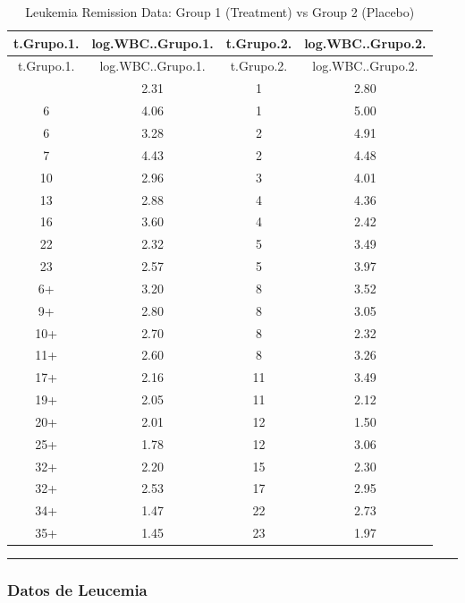 \documentclass[
]{article}
\begin{document}
\begin{tcolorbox}[enhanced jigsaw, opacityback=0, bottomrule=.15mm, leftrule=.75mm, rightrule=.15mm, arc=.35mm, toprule=.15mm, left=2mm, colframe=quarto-callout-note-color-frame, breakable, colback=white]
\begin{longtable}[]{@{}cccc@{}}
\caption{Leukemia Remission Data: Group 1 (Treatment) vs Group 2
(Placebo)}\tabularnewline
\toprule\noalign{}
t.Grupo.1. & log.WBC..Grupo.1. & t.Grupo.2. & log.WBC..Grupo.2. \\
\midrule\noalign{}
\endfirsthead
\toprule\noalign{}
t.Grupo.1. & log.WBC..Grupo.1. & t.Grupo.2. & log.WBC..Grupo.2. \\
\midrule\noalign{}
\endhead
\bottomrule\noalign{}
\endlastfoot
6 & 2.31 & 1 & 2.80 \\
6 & 4.06 & 1 & 5.00 \\
6 & 3.28 & 2 & 4.91 \\
7 & 4.43 & 2 & 4.48 \\
10 & 2.96 & 3 & 4.01 \\
13 & 2.88 & 4 & 4.36 \\
16 & 3.60 & 4 & 2.42 \\
22 & 2.32 & 5 & 3.49 \\
23 & 2.57 & 5 & 3.97 \\
6+ & 3.20 & 8 & 3.52 \\
9+ & 2.80 & 8 & 3.05 \\
10+ & 2.70 & 8 & 2.32 \\
11+ & 2.60 & 8 & 3.26 \\
17+ & 2.16 & 11 & 3.49 \\
19+ & 2.05 & 11 & 2.12 \\
20+ & 2.01 & 12 & 1.50 \\
25+ & 1.78 & 12 & 3.06 \\
32+ & 2.20 & 15 & 2.30 \\
32+ & 2.53 & 17 & 2.95 \\
34+ & 1.47 & 22 & 2.73 \\
35+ & 1.45 & 23 & 1.97 \\
\end{longtable}

\end{tcolorbox}

\begin{center}\rule{0.5\linewidth}{0.5pt}\end{center}

\subsubsection{Datos de Leucemia}\label{datos-de-leucemia}
\end{document}
